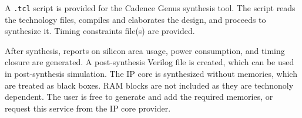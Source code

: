 A {\tt .tcl} script is provided for the Cadence Genus synthesis tool. The script
reads the technology files, compiles and elaborates the design, and proceeds to
synthesize it. Timing constraints file(s) are provided.

After synthesis, reports on silicon area usage, power consumption, and timing
closure are generated. A post-synthesis Verilog file is created, which can be
used in post-synthesis simulation. The IP core is synthesized without memories,
which are treated as black boxes. RAM blocks are not included as they are
technonoly dependent. The user is free to generate and add the required
memories, or request this service from the IP core provider.
